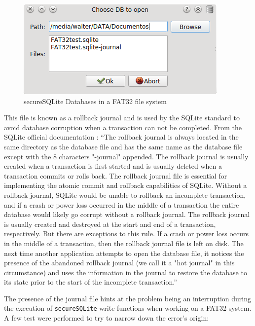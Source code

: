 \begin{figure}[htb]
  \centering
  \captionsetup{justification=centering}
  \centerline{\includegraphics[width=0.55\columnwidth]{chapters/figures/development/fat32.png}}
  \caption{secureSQLite Databases in a FAT32 file system}
  \label{fig:fat32}
\end{figure}

This file is known as a rollback journal and is used by the SQLite standard to avoid database corruption when a transaction can not be completed. From the SQLite official documentation \cite{journal}:
``The rollback journal is always located in the same directory as the database file and has the same name as the database file except with the 8 characters "-journal" appended. The rollback journal is usually created when a transaction is first started and is usually deleted when a transaction commits or rolls back. The rollback journal file is essential for implementing the atomic commit and rollback capabilities of SQLite. Without a rollback journal, SQLite would be unable to rollback an incomplete transaction, and if a crash or power loss occurred in the middle of a transaction the entire database would likely go corrupt without a rollback journal.
The rollback journal is usually created and destroyed at the start and end of a transaction, respectively. But there are exceptions to this rule.
If a crash or power loss occurs in the middle of a transaction, then the rollback journal file is left on disk. The next time another application attempts to open the database file, it notices the presence of the abandoned rollback journal (we call it a "hot journal" in this circumstance) and uses the information in the journal to restore the database to its state prior to the start of the incomplete transaction.''

The presence of the journal file hints at the problem being an interruption during the execution of \texttt{secureSQLite} write functions when working on a FAT32 system. A few test were performed to try to narrow down the error's origin:

